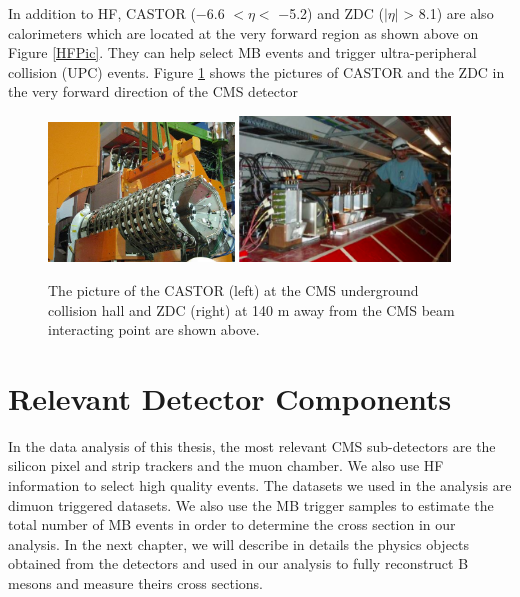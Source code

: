 In addition to HF, CASTOR ($-$6.6 $< \eta <$ $-$5.2) and ZDC ($|\eta|$ > 8.1) are also calorimeters which are located at the very forward region \cite{CASZDCRef} as shown above on Figure \ref{HFPic}. They can help select MB events and trigger ultra-peripheral collision (UPC) events. Figure \ref{CASTORZDC} shows the pictures of CASTOR and the ZDC in the very forward direction of the CMS detector

\begin{figure}[hbtp]
\begin{center}
\includegraphics[width=0.44\textwidth]{Figures/Chapter3/CASTOR.png}
\includegraphics[width=0.50\textwidth]{Figures/Chapter3/CMSZDC.png}
\caption{The picture of the CASTOR (left) at the CMS underground collision hall and ZDC (right) at 140 m away from the CMS beam interacting point are shown above.}
\label{CASTORZDC}
\end{center}
\end{figure} 


\section{Relevant Detector Components}

In the data analysis of this thesis, the most relevant CMS sub-detectors are the silicon pixel and strip trackers and the muon chamber. We also use HF information to select high quality events. The datasets we used in the analysis are dimuon triggered datasets. We also use the MB trigger samples to estimate the total number of MB events in order to determine the cross section in our analysis. In the next chapter, we will describe in details the physics objects obtained from the detectors and used in our analysis to fully reconstruct B mesons and measure theirs cross sections.






